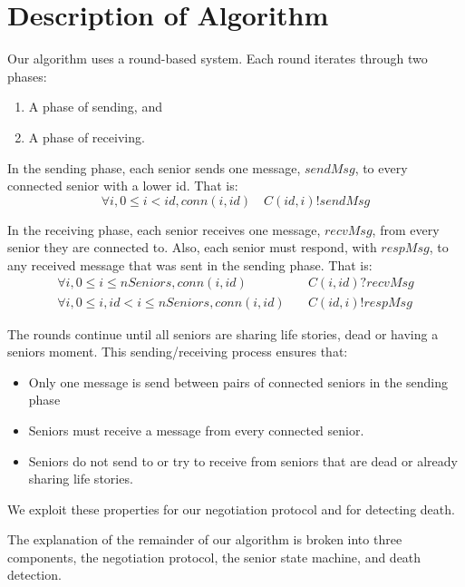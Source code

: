 \documentclass[12pt,a4paper]{scrartcl}
\begin{document}
\section{Description of Algorithm}
Our algorithm uses a round-based system.
Each round iterates through two phases:
\begin{enumerate}
    \item A phase of sending, and
    \item A phase of receiving.
\end{enumerate}

In the sending phase, each senior sends one message, $sendMsg$, to every connected senior with a lower id.
That is:
\begin{equation}
    \forall i, 0 \le i < id, conn(i, id) \quad C(id,i)!sendMsg
\label{eq:send-phase}
\end{equation}

In the receiving phase, each senior receives one message, $recvMsg$, from every senior they are connected to.
Also, each senior must respond, with $respMsg$, to any received message that was sent in the sending phase.
That is:
\begin{align}
    \forall i, 0 \le i \le nSeniors, conn(i, id) &\quad C(i,id)?recvMsg \\
    \forall i, 0 \le i, id < i \le nSeniors, conn(i, id) &\quad C(id,i)!respMsg
\label{eq:recv-phase}
\end{align}

The rounds continue until all seniors are sharing life stories, dead or having a seniors moment.
This sending/receiving process ensures that:
\begin{itemize}
    \item Only one message is send between pairs of connected seniors in the sending phase
    \item Seniors must receive a message from every connected senior.
    \item Seniors do not send to or try to receive from seniors that are dead or already sharing life stories.
\end{itemize}
We exploit these properties for our negotiation protocol and for detecting death.

The explanation of the remainder of our algorithm is broken into three components, the negotiation protocol, the senior state machine, and death detection.
\end{document}
